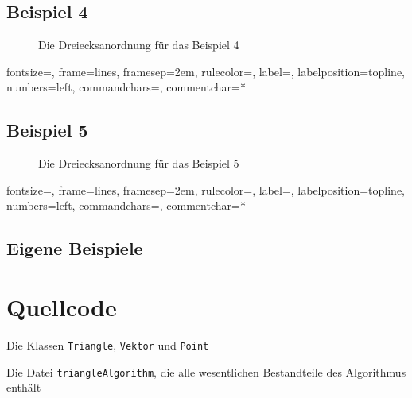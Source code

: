 \documentclass[a4paper, notitlepage, 12pt]{scrartcl}
\newenvironment{longlisting}{\captionsetup{type=listing}}{}
\begin{document}
\subsection{Beispiel 4}
\begin{figure}[H] 
	
	\caption{Die Dreiecksanordnung für das Beispiel 4}
\end{figure}
%
{fontsize=\footnotesize,
	frame=lines,  %
	framesep=2em, %
	rulecolor=\color{Gray},
	label=,
	labelposition=topline,
	numbers=left,
	commandchars=\|\(\), %
	commentchar=*        %
}
\subsection{Beispiel 5}
\begin{figure}[H] 
	
	\caption{Die Dreiecksanordnung für das Beispiel 5}
\end{figure}
%
{fontsize=\footnotesize,
	frame=lines,  %
	framesep=2em, %
	rulecolor=\color{Gray},
	label=,
	labelposition=topline,
	numbers=left,
	commandchars=\|\(\), %
	commentchar=*        %
}
\subsection{Eigene Beispiele}

 \section{Quellcode}
 \renewcommand{\listingscaption}{Quellcode}
 
 \begin{longlisting}
 	
 	\caption{Die Klassen \texttt{Triangle}, \texttt{Vektor} und \texttt{Point}}
 	
 	\caption{Die Datei \texttt{triangleAlgorithm}, die alle wesentlichen Bestandteile des Algorithmus enthält}
 \end{longlisting}
 
 
\end{document}
